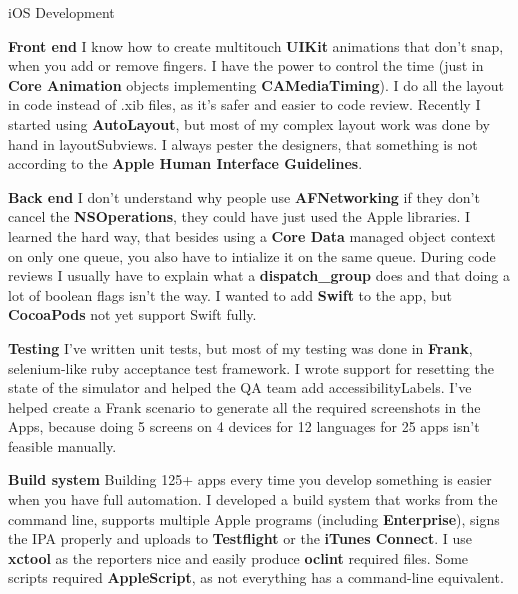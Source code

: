 \documentclass[letterpaper]{article}
\renewenvironment{itemize}{
  \begin{list}{}{
    \setlength{\leftmargin}{1.5em}
  }
}{
  \end{list}
}
\begin{document}
\begin{itemize}
	\item iOS Development \begin{itemize}

		\item {\bf Front end} I know how to create multitouch {\bf UIKit} animations that don't snap, when you add or remove fingers. I have the power to control the time (just in {\bf Core Animation} objects implementing {\bf CAMediaTiming}). I do all the layout in code instead of .xib files, as it's safer and easier to code review. Recently I started using {\bf AutoLayout}, but most of my complex layout work was done by hand in layoutSubviews. I always pester the designers, that something is not according to the {\bf Apple Human Interface Guidelines}.
		
		\item {\bf Back end} I don't understand why people use {\bf AFNetworking} if they don't cancel the {\bf NSOperations}, they could have just used the Apple libraries. I learned the hard way, that besides using a {\bf Core Data} managed object context on only one queue, you also have to intialize it on the same queue. During code reviews I usually have to explain what a {\bf dispatch\_group} does and that doing a lot of boolean flags isn't the way. I wanted to add {\bf Swift} to the app, but {\bf CocoaPods} not yet support Swift fully.
		
		\item {\bf Testing} I've written unit tests, but most of my testing was done in {\bf Frank}, selenium-like ruby acceptance test framework. I wrote support for resetting the state of the simulator and helped the QA team add accessibilityLabels. I've helped create a Frank scenario to generate all the required screenshots in the Apps, because doing 5 screens on 4 devices for 12 languages for 25 apps isn't feasible manually.
		
		\item {\bf Build system} Building 125+ apps every time you develop something is easier when you have full automation. I developed a build system that works from the command line, supports multiple Apple programs (including {\bf Enterprise}), signs the IPA properly and uploads to {\bf Testflight} or the {\bf iTunes Connect}. I use {\bf xctool} as the reporters nice and easily produce {\bf oclint} required files. Some scripts required {\bf AppleScript}, as not everything has a command-line equivalent.

	\end{itemize}	


\end{itemize}
\end{document}
